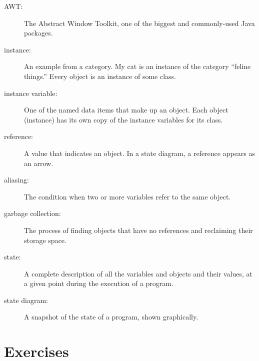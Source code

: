 \begin{description}

\item[AWT:]  The Abstract Window Toolkit, one of the biggest
and commonly-used Java packages.

\item[instance:]  An example from a category.  My cat is an
instance of the category ``feline things.''  Every object is
an instance of some class.

\item[instance variable:]  One of the named data items that make
up an object.  Each object (instance) has its own copy of
the instance variables for its class.

\item[reference:]  A value that indicates an object.  In a
state diagram, a reference appears as an arrow.

\item[aliasing:] The condition when two or more variables refer
to the same object.

\item[garbage collection:]  The process of finding objects that
have no references and reclaiming their storage space.

\item[state:] A complete description of all the variables and
objects and their values, at a given point during the execution
of a program.

\item[state diagram:] A snapshot of the state of a program, shown
graphically.


\end{description}


\section{Exercises}

